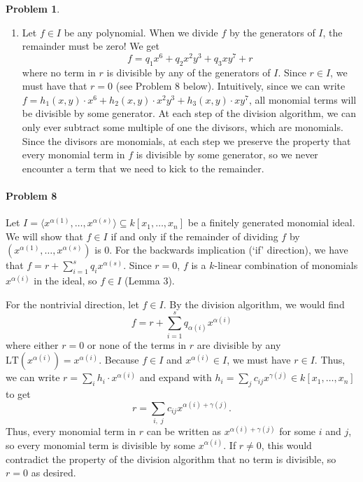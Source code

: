 \documentclass[12pt]{amsart}
\theoremstyle{definition}
\newtheorem{prob}{Problem}
\begin{document}
\begin{flushleft}
\begin{prob}
\begin{enumerate}
\begin{figure}
    \caption{Elements $x^m y^n \in \langle x^6, x^2y^3, xy^7\rangle \subseteq k[x,y]$}
    \label{fig1}
    \end{figure}
    \item[b.] Let $f \in I$ be any polynomial. When we divide $f$ by the generators of $I$, the remainder must be zero! We get 
    \[
    f = q_1 x^6+q_2 x^2y^3+q_3xy^7+r
    \]
    where no term in $r$ is divisible by any of the generators of $I$. Since $r \in I$, we must have that $r = 0$ (see Problem 8 below). Intuitively, since we can write $f = h_1(x,y)\cdot x^6 +h_2(x,y)\cdot x^2y^3+h_3(x,y)\cdot xy^7$, all monomial terms will be divisible by some generator. At each step of the division algorithm, we can only ever subtract some multiple of one the divisors, which are monomials. Since the divisors are monomials, at each step we preserve the property that every monomial term in $f$ is divisible by some generator, so we never encounter a term that we need to kick to the remainder.
\end{enumerate}
\newpage{}
\paragraph{Problem 8}
Let $I = \langle x^{\alpha(1)},\dots,x^{\alpha(s)}\rangle\subseteq k[x_1,\dots,x_n]$ be a finitely generated monomial ideal. We will show that $f \in I$ if and only if the remainder of dividing $f$ by $(x^{\alpha(1)},\dots,x^{\alpha(s)})$ is $0$. For the backwards implication (`if' direction), we have that $f = r+\sum_{i=1}^s q_i x^{\alpha(s)}$. Since $r=0$, $f$ is a $k$-linear combination of monomials $x^{\alpha(i)}$ in the ideal, so $f \in I$ (Lemma 3). 

For the nontrivial direction, let $f \in I$. By the division algorithm, we would find \[ f = r +\sum_{i=1}^s q_{\alpha(i)} x^{\alpha(i)}\]
where either $r=0$ or none of the terms in $r$ are divisible by any $\text{LT}\left(x^{\alpha(i)}\right) = x^{\alpha(i)}$. Because $f \in I$ and $x^{\alpha(i)} \in I$, we must have $r \in I$. Thus, we can write $r = \sum_i h_i \cdot x^{\alpha(i)}$ and expand with $h_i = \sum_{j} c_{ij} x^{\gamma(j)} \in k[x_1,\dots,x_n]$ to get \[
r=\sum_{i,\;j} c_{ij}x^{\alpha(i)+\gamma(j)}.
\] Thus, every monomial term in $r$ can be written as $x^{\alpha(i)+\gamma(j)}$ for some $i$ and $j$, so every monomial term is divisible by some $x^{\alpha(i)}$. If $r\ne0$, this would contradict the property of the division algorithm that no term is divisible, so $r=0$ as desired.



\end{prob}
\end{flushleft}
\end{document}
